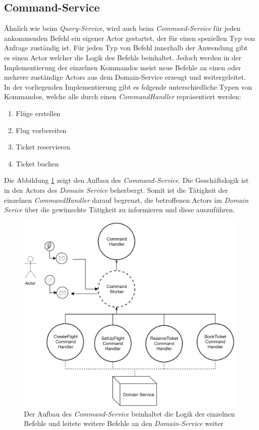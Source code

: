 \subsection{Command-Service}
\label{subsec:implementation:commandService}
 Ähnlich wie beim \textit{Query-Service}, wird auch beim \textit{Command-Service} für jeden ankommenden Befehl ein eigener Actor gestartet, der für einen speziellen Typ von Anfrage zuständig ist. Für jeden Typ von Befehl innerhalb der Anwendung gibt es einen Actor welcher die Logik des Befehls beinhaltet. Jedoch werden in der Implementierung der einzelnen Kommandos meist neue Befehle an einen oder mehrere zuständige Actors aus dem Domain-Service erzeugt und weitergeleitet. \\
 In der vorliegenden Implementierung gibt es folgende unterschiedliche Typen von Kommandos, welche alle durch einen \textit{CommandHandler} repräsentiert werden:
 \begin{enumerate}
   \item Flüge erstellen
   \item Flug vorbereiten
   \item Ticket reservieren
   \item Ticket buchen
 \end{enumerate}
Die Abbildung \ref{fig:implementation:commandActorModel} zeigt den Aufbau des \textit{Command-Service}. Die Geschäftslogik ist in den Actors des \textit{Domain Service} beherbergt. Somit ist die Tätigkeit der einzelnen \textit{CommandHandler} darauf begrenzt, die betroffenen Actors im \textit{Domain Serice} über die gewünschte Tätigkeit zu informieren und diese auszuführen. 
 \begin{figure}
  \centering
  \includegraphics[width=0.8\linewidth]{gfx/implementation/CommandServiceActorModel}
  \caption{Der Aufbau des \textit{Command-Service} beinhaltet die Logik der einzelnen Befehle und leitete weitere Befehle an den \textit{Domain-Service} weiter }
  \label{fig:implementation:commandActorModel}
\end{figure} 

